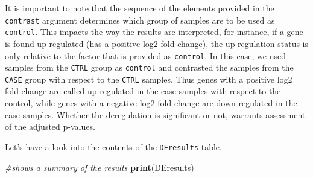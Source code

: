 \documentclass[12pt,]{krantz}
\newenvironment{Shaded}{\begin{snugshade}}{\end{snugshade}}
\newcommand{\CommentTok}[1]{\textcolor[rgb]{0.56,0.35,0.01}{\textit{#1}}}
\newcommand{\KeywordTok}[1]{\textcolor[rgb]{0.13,0.29,0.53}{\textbf{#1}}}
\newcommand{\NormalTok}[1]{#1}
\begin{document}
It is important to note that the sequence of the elements provided in the \texttt{contrast} argument determines which group of samples are to be used as \texttt{control}. This impacts the way the results are interpreted, for instance, if a gene is found up-regulated (has a positive log2 fold change), the up-regulation status is only relative to the factor that is provided as \texttt{control}. In this case, we used samples from the \texttt{CTRL} group as \texttt{control} and contrasted the samples from the \texttt{CASE} group with respect to the \texttt{CTRL} samples. Thus genes with a positive log2 fold change are called up-regulated in the case samples with respect to the control, while genes with a negative log2 fold change are down-regulated in the case samples. Whether the deregulation is significant or not, warrants assessment of the adjusted p-values.

Let's have a look into the contents of the \texttt{DEresults} table.

\begin{Shaded}
\begin{Highlighting}[]
\CommentTok{#shows a summary of the results}
\KeywordTok{print}\NormalTok{(DEresults)}
\end{Highlighting}
\end{Shaded}
\end{document}
